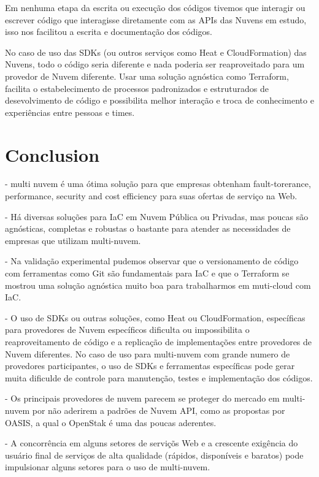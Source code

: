 \documentclass[12pt]{article}
\begin{document}
	Em nenhuma etapa da escrita ou execução dos códigos tivemos que interagir ou escrever código que interagisse diretamente com as APIs das Nuvens em estudo, isso nos facilitou a escrita e documentação dos códigos.
	
	No caso de uso das SDKs (ou outros serviços como Heat e CloudFormation) das Nuvens, todo o código seria diferente e nada poderia ser reaproveitado para um provedor de Nuvem diferente. Usar uma solução agnóstica como Terraform, facilita o estabelecimento de processos padronizados e estruturados de desevolvimento de código e possibilita melhor interação e troca de conhecimento e experiências entre pessoas e times.		
	
	\section{Conclusion}
		
	- multi nuvem é uma ótima solução para que empresas obtenham fault-torerance, performance, security and cost efficiency para suas ofertas de serviço na Web.
	
	- Há diversas soluções para IaC em Nuvem Pública ou Privadas, mas poucas são agnósticas, completas e robustas o bastante para atender as necessidades de empresas que utilizam multi-nuvem.
	
	- Na validação experimental pudemos observar que o versionamento de código com ferramentas como Git são fundamentais para IaC e que o Terraform se mostrou uma solução agnóstica muito boa para trabalharmos em muti-cloud com IaC.
	
	- O uso de SDKs ou outras soluções, como Heat ou CloudFormation, específicas para provedores de Nuvem específicos dificulta ou impossibilita o reaproveitamento de código e a replicação de implementações entre provedores de Nuvem diferentes. No caso de uso para multi-nuvem com grande numero de provedores participantes, o uso de SDKs e ferramentas específicas pode gerar muita dificulde de controle para manutenção, testes e implementação dos códigos.
	
	- Os principais provedores de nuvem parecem se proteger do mercado em multi-nuvem por não aderirem a padrões de Nuvem API, como as propostas por OASIS, a qual o OpenStak é uma das poucas aderentes.
	
	- A concorrência em alguns setores de serviçõs Web e a crescente exigência do usuário final de serviços de alta qualidade (rápidos, disponíveis e baratos) pode impulsionar alguns setores para o uso de multi-nuvem.	
	
\end{document}
